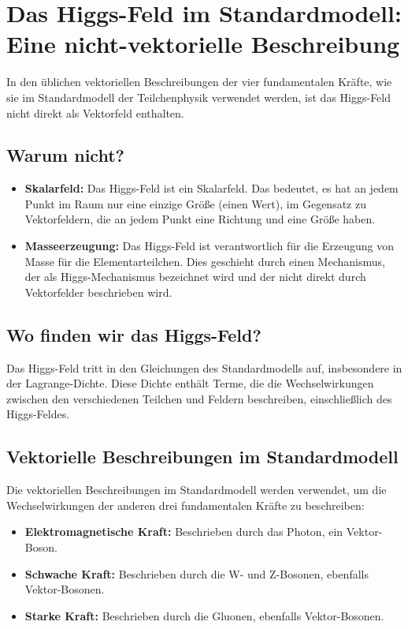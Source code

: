 \documentclass{article}
\begin{document}
\section{Das Higgs-Feld im Standardmodell: Eine nicht-vektorielle Beschreibung}

In den üblichen vektoriellen Beschreibungen der vier fundamentalen Kräfte, wie sie im Standardmodell der Teilchenphysik verwendet werden, ist das Higgs-Feld nicht direkt als Vektorfeld enthalten.

\subsection*{Warum nicht?}

\begin{itemize}
	\item \textbf{Skalarfeld:} Das Higgs-Feld ist ein Skalarfeld. Das bedeutet, es hat an jedem Punkt im Raum nur eine einzige Größe (einen Wert), im Gegensatz zu Vektorfeldern, die an jedem Punkt eine Richtung und eine Größe haben.
	\item \textbf{Masseerzeugung:} Das Higgs-Feld ist verantwortlich für die Erzeugung von Masse für die Elementarteilchen. Dies geschieht durch einen Mechanismus, der als Higgs-Mechanismus bezeichnet wird und der nicht direkt durch Vektorfelder beschrieben wird.
\end{itemize}

\subsection*{Wo finden wir das Higgs-Feld?}

Das Higgs-Feld tritt in den Gleichungen des Standardmodells auf, insbesondere in der Lagrange-Dichte. Diese Dichte enthält Terme, die die Wechselwirkungen zwischen den verschiedenen Teilchen und Feldern beschreiben, einschließlich des Higgs-Feldes.

\subsection*{Vektorielle Beschreibungen im Standardmodell}

Die vektoriellen Beschreibungen im Standardmodell werden verwendet, um die Wechselwirkungen der anderen drei fundamentalen Kräfte zu beschreiben:

\begin{itemize}
	\item \textbf{Elektromagnetische Kraft:} Beschrieben durch das Photon, ein Vektor-Boson.
	\item \textbf{Schwache Kraft:} Beschrieben durch die W- und Z-Bosonen, ebenfalls Vektor-Bosonen.
	\item \textbf{Starke Kraft:} Beschrieben durch die Gluonen, ebenfalls Vektor-Bosonen.
\end{itemize}
\end{document}

